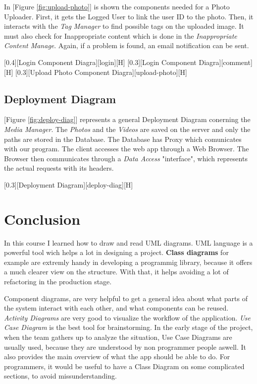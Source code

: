 \documentclass{article}
\begin{document}
			\bigskip
			In [Figure \ref{fig:upload-photo}] is shown the components needed for a Photo Uploader. First, it gets the Logged User to link the user ID to the photo. Then, it interacts with the \textit{Tag Manager} to find possible tags on the uploaded image. It must also check for Inappropriate content which is done in the \textit{Inappropriate Content Manage}. Again, if a problem is found, an email notification can be sent.

			[0.4][Login Component Diagra][login][H]
			[0.3][Login Component Diagra][comment][H]
			[0.3][Upload Photo Component Diagra][upload-photo][H]

		\subsection{Deployment Diagram}
			[Figure \ref{fig:deploy-diag}] represents a general Deployment Diagram conerning the \textit{Media Manager}. The \textit{Photos} and the \textit{Videos} are saved on the server and only the paths are stored in the Database. The Database has Proxy which comunicates with our program. The client accesses the web app through a Web Browser. The Browser then communicates through a \textit{Data Access} "interface", which represents the actual requests with its headers.

			[0.3][Deployment Diagram][deploy-diag][H]			

	\section{Conclusion}
		In this course I learned how to draw and read UML diagrams. UML language is a powerful tool wich helps a lot in designing a project. \textbf{Class diagrams} for example are extremly handy in developing a programmig library, because it offers a much clearer view on the structure. With that, it helps avoiding a lot of refactoring in the production stage.

		Component diagrams, are very helpful to get a general idea about what parts of the system interact with each other, and what components can be reused. \textit{Activity Diagrams} are very good to visualize the workflow of the application. \textit{Use Case Diagram} is the best tool for brainstorming. In the early stage of the project, when the team gathers up to analyze the situation, Use Case Diagrams are usually used, because they are understood by non programmer people aswell. It also provides the main overview of what the app should be able to do. For programmers, it would be useful to have a Class Diagram on some complicated sections, to avoid missunderstanding.
\end{document}
